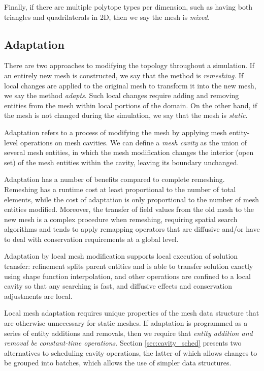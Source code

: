 Finally, if there are multiple polytope types per dimension,
such as having both triangles and quadrilaterals in 2D, then
we say the mesh is {\it mixed}.

\subsection{Adaptation}
\label{sec:def_adapt}

There are two approaches to modifying the topology throughout
a simulation.
If an entirely new mesh is constructed, we say that the
method is {\it remeshing}.
If local changes are applied to the original mesh to transform
it into the new mesh, we say the method {\it adapts}.
Such local changes require adding and removing entities
from the mesh within local portions of the domain.
On the other hand, if the mesh is not changed during the
simulation, we say that the mesh is {\it static}.

Adaptation refers to a process of modifying the mesh by applying
mesh entity-level operations on mesh cavities.
We can define a {\it mesh cavity} as the
union of several mesh entities, in which the
mesh modification changes the interior (open set) of
the mesh entities within the cavity, leaving its boundary unchanged.

Adaptation has a number of benefits compared to complete remeshing.
Remeshing has a runtime cost at least proportional to the number
of total elements, while the cost of adaptation is only proportional
to the number of mesh entities modified.
Moreover, the transfer of field values from the old mesh
to the new mesh is a complex procedure when remeshing,
requiring spatial search algorithms and
tends to apply remapping operators that are diffusive and/or
have to deal with conservation requirements at a global level.

Adaptation by local mesh modification supports local execution
of solution transfer: refinement splits
parent entities and is able to transfer solution exactly using
shape function interpolation, and other operations are confined
to a local cavity so that any searching is fast,
and diffusive effects and conservation adjustments are local.

Local mesh adaptation requires unique properties of the
mesh data structure that are otherwise unnecessary for
static meshes.
If adaptation is programmed as a series of entity
additions and removals, then we require that \emph{entity
addition and removal be constant-time operations}.
Section \ref{sec:cavity_sched} presents two alternatives
to scheduling cavity operations, the latter of which
allows changes to be grouped into batches, which allows
the use of simpler data structures.

